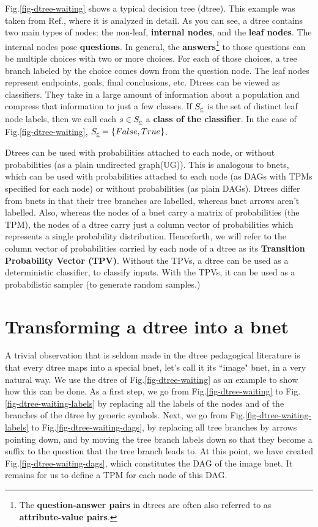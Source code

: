 Fig.\ref{fig-dtree-waiting}
shows a typical decision tree (dtree).
This example was taken
from Ref.\cite{stu-nor-book},
where it is analyzed
in detail.
As you can see,
a dtree contains two main types
of nodes: the non-leaf, 
{\bf internal nodes},
and the {\bf leaf nodes}.
The internal nodes pose 
{\bf questions}. In general,
the {\bf answers}\footnote
{The {\bf question-answer pairs}
in dtrees are often
also referred to as 
{\bf attribute-value pairs}.}
 to those
questions can
be multiple choices with
two or more choices.
For each of those choices,
a tree branch labeled by the choice
 comes down from the 
question node.
The leaf nodes represent 
endpoints, goals, final
conclusions, etc.
Dtrees can be viewed
as classifiers. They
take in a large amount 
of information about a population 
and compress that information
to just a few classes.
If $S_{\underline{c}}$ is the 
set of distinct leaf node labels,
then we call each
$s\in S_{\underline{c}}$
a  {\bf class of the classifier}.
In the case of
Fig.\ref{fig-dtree-waiting},
$S_{\underline{c}}=\{False, True\}$.

Dtrees can be used 
with
probabilities attached to each node, or without
probabilities
(as a
plain undirected graph(UG)).
This is analogous to bnets,
which can be used with
probabilities attached to each node
 (as DAGs with
TPMs specified for each node) or without
probabilities (as plain
DAGs).
Dtrees differ 
from bnets in that
their tree branches 
are labelled, whereas bnet arrows
 aren't labelled.
Also,
whereas the nodes of
a bnet carry a matrix of 
probabilities (the TPM),
the nodes of a dtree carry
just a column vector
of probabilities
which represents
a single 
probability distribution.
Henceforth,
we will refer to
the column vector
of probabilities
carried by each node of a dtree
as its {\bf Transition
Probability Vector (TPV)}.
Without the TPVs,
a dtree can be used 
as a deterministic classifier,
to classify inputs.
With the TPVs,
it can be used as a 
probabilistic sampler (to generate
random samples.)

\section{Transforming a dtree into a bnet}
A trivial 
observation
that is seldom made
in the dtree pedagogical literature
is that every dtree 
maps into a special bnet, 
let's call it
its ``image" bnet,
in a very natural way.
We use the dtree
of Fig.\ref{fig-dtree-waiting}
as an example to show 
how this can be
done. As 
a first 
step,
we go from
Fig.\ref{fig-dtree-waiting}
to
Fig.\ref{fig-dtree-waiting-labels}
by
replacing
all the labels of the
nodes and of the branches of
the dtree 
by generic symbols. 
Next, we go 
from Fig.\ref{fig-dtree-waiting-labels}
to Fig.\ref{fig-dtree-waiting-dags},
by replacing all tree branches 
by arrows pointing down,
 and by
moving the tree branch labels 
down so that they
become a suffix to the question 
that the tree branch leads to.
At this point,
we have created
Fig.\ref{fig-dtree-waiting-dags},
which constitutes
the DAG of the image bnet.
It remains for us to define
a TPM for each node
of this DAG.

